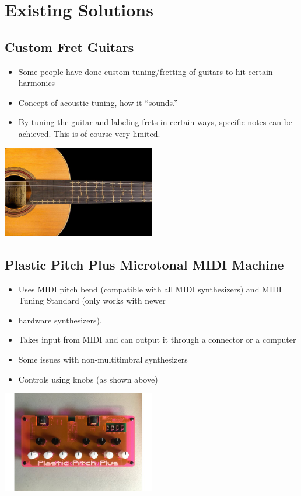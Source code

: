 \documentclass{article}
\begin{document}
\section*{Existing Solutions}

\subsection*{Custom Fret Guitars}

\begin{itemize}
	\item Some people have done custom tuning/fretting of guitars to hit certain harmonics
	\item Concept of acoustic tuning, how it “sounds.”
	\item By tuning the guitar and labeling frets in certain ways, specific notes can be achieved. This is of course very limited.
\end{itemize}

\begin{center}
\includegraphics[width=0.5\textwidth]{mt1.jpg}
\end{center}

\subsection*{Plastic Pitch Plus Microtonal MIDI Machine}

\begin{itemize}
	\item Uses MIDI pitch bend (compatible with all MIDI synthesizers) and MIDI Tuning Standard (only works with newer 	\item hardware synthesizers).
	\item Takes input from MIDI and can output it through a connector or a computer
	\item Some issues with non-multitimbral synthesizers
	\item Controls using knobs (as shown above)
\end{itemize}

\begin{center}
\includegraphics[width=0.5\textwidth]{mt2.jpg}
\end{center}
\end{document}
